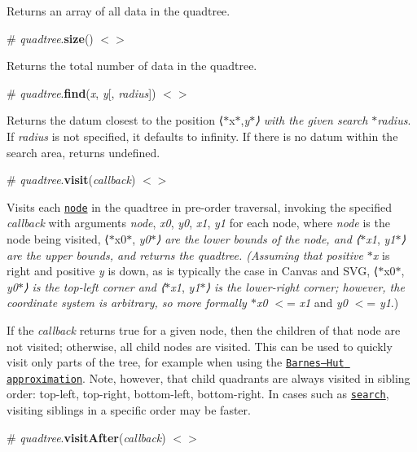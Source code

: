 Returns an array of all data in the quadtree.

\label{_quadtree_size}%
\# {\itshape quadtree}.{\bfseries size}() \href{https://github.com/d3/d3-quadtree/blob/master/src/size.js}{\tt $<$$>$}

Returns the total number of data in the quadtree.

\label{_quadtree_find}%
\# {\itshape quadtree}.{\bfseries find}({\itshape x}, {\itshape y}\mbox{[}, {\itshape radius}\mbox{]}) \href{https://github.com/d3/d3-quadtree/blob/master/src/find.js}{\tt $<$$>$}

Returns the datum closest to the position ⟨$\ast$x$\ast$,{\itshape y$\ast$⟩ with the given search $\ast$radius}. If {\itshape radius} is not specified, it defaults to infinity. If there is no datum within the search area, returns undefined.

\label{_quadtree_visit}%
\# {\itshape quadtree}.{\bfseries visit}({\itshape callback}) \href{https://github.com/d3/d3-quadtree/blob/master/src/visit.js}{\tt $<$$>$}

Visits each \href{#nodes}{\tt node} in the quadtree in pre-\/order traversal, invoking the specified {\itshape callback} with arguments {\itshape node}, {\itshape x0}, {\itshape y0}, {\itshape x1}, {\itshape y1} for each node, where {\itshape node} is the node being visited, ⟨$\ast$x0$\ast$, {\itshape y0$\ast$⟩ are the lower bounds of the node, and ⟨$\ast$x1}, {\itshape y1$\ast$⟩ are the upper bounds, and returns the quadtree. (Assuming that positive $\ast$x} is right and positive {\itshape y} is down, as is typically the case in Canvas and S\+VG, ⟨$\ast$x0$\ast$, {\itshape y0$\ast$⟩ is the top-\/left corner and ⟨$\ast$x1}, {\itshape y1$\ast$⟩ is the lower-\/right corner; however, the coordinate system is arbitrary, so more formally $\ast$x0} $<$= {\itshape x1} and {\itshape y0} $<$= {\itshape y1}.)

If the {\itshape callback} returns true for a given node, then the children of that node are not visited; otherwise, all child nodes are visited. This can be used to quickly visit only parts of the tree, for example when using the \href{https://en.wikipedia.org/wiki/Barnes–Hut_simulation}{\tt Barnes–\+Hut approximation}. Note, however, that child quadrants are always visited in sibling order\+: top-\/left, top-\/right, bottom-\/left, bottom-\/right. In cases such as \href{#quadtree_find}{\tt search}, visiting siblings in a specific order may be faster.

\label{_quadtree_visitAfter}%
\# {\itshape quadtree}.{\bfseries visit\+After}({\itshape callback}) \href{https://github.com/d3/d3-quadtree/blob/master/src/visitAfter.js}{\tt $<$$>$}

